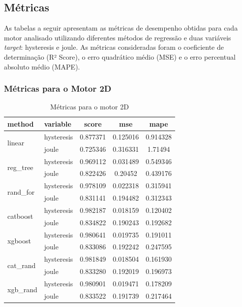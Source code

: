 \documentclass{article}
\begin{document}
\subsection{Métricas}

As tabelas a seguir apresentam as métricas de desempenho obtidas para cada motor analisado utilizando diferentes métodos de regressão e duas variáveis \textit{target}: hysteresis e joule. As métricas consideradas foram o coeficiente de determinação (R² Score), o erro quadrático médio (MSE) e o erro percentual absoluto médio (MAPE).

\subsubsection{Métricas para o Motor 2D}


\begin{table}[!htbp]
\centering
\caption{Métricas para o motor 2D}
\begin{tabular}{llccc}
\toprule
\textbf{method} & \textbf{variable} & \textbf{score} & \textbf{mse} & \textbf{mape} \\
\midrule
\multirow{2}{*}{linear} 
    & hysteresis & 0.877371 & 0.125016 & 0.914328 \\
    & joule      & 0.725346 & 0.316331 & 1.71494 \\
\midrule
\multirow{2}{*}{reg\_tree} 
    & hysteresis & 0.969112 & 0.031489 & 0.549346 \\
    & joule      & 0.822426 & 0.20452 & 0.439176 \\
\midrule
\multirow{2}{*}{rand\_for} 
    & hysteresis & 0.978109 & 0.022318 & 0.315941 \\
    & joule      & 0.831141 & 0.194482 & 0.312343 \\
\midrule
\multirow{2}{*}{catboost} 
    & hysteresis & 0.982187 & 0.018159 & 0.120402 \\
    & joule      & 0.834822 & 0.190243 & 0.192682 \\
\midrule
\multirow{2}{*}{xgboost} 
    & hysteresis & 0.980641 & 0.019735 & 0.191011 \\
    & joule      & 0.833086 & 0.192242 & 0.247595 \\
\midrule
\multirow{2}{*}{cat\_rand} 
    & hysteresis & 0.981849 & 0.018504 & 0.161930 \\
    & joule      & 0.833280 & 0.192019 & 0.196973 \\
\midrule
\multirow{2}{*}{xgb\_rand} 
    & hysteresis & 0.980901 & 0.019471 & 0.178209 \\
    & joule      & 0.833522 & 0.191739 & 0.217464 \\
\bottomrule
\end{tabular}
\end{table}
\end{document}
